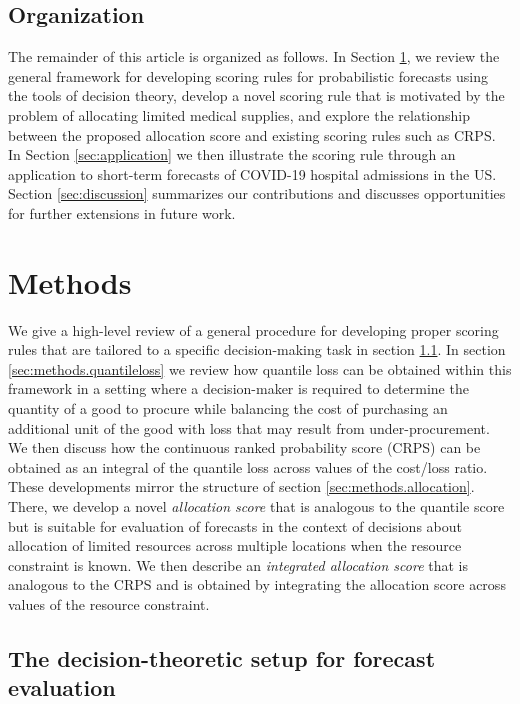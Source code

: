 \documentclass{article}
\begin{document}
\subsection{Organization}

The remainder of this article is organized as follows. 
In Section \ref{sec:methods}, we review the general framework for developing scoring rules for probabilistic forecasts using the tools of decision theory, develop a novel scoring rule that is motivated by the problem of allocating limited medical supplies, and explore the relationship between the proposed allocation score and existing scoring rules such as CRPS. 
In Section \ref{sec:application} we then illustrate the scoring rule through an application to short-term forecasts of COVID-19 hospital admissions in the US. 
Section \ref{sec:discussion} summarizes our contributions and discusses opportunities for further extensions in future work.


\section{Methods}
\label{sec:methods}

We give a high-level review of a general procedure for developing proper scoring rules that are tailored to a specific decision-making task in section \ref{sec:methods.decisiontheory}. In section \ref{sec:methods.quantileloss} we review how quantile loss can be obtained within this framework in a setting where a decision-maker is required to determine the quantity of a good to procure while balancing the cost of purchasing an additional unit of the good with loss that may result from under-procurement. We then discuss how the continuous ranked probability score (CRPS) can be obtained as an integral of the quantile loss across values of the cost/loss ratio. These developments mirror the structure of section \ref{sec:methods.allocation}. There, we develop a novel \emph{allocation score} that is analogous to the quantile score but is suitable for evaluation of forecasts in the context of decisions about allocation of limited resources across multiple locations when the resource constraint is known. We then describe an \emph{integrated allocation score} that is analogous to the CRPS and is obtained by integrating the allocation score across values of the resource constraint.

\subsection{The decision-theoretic setup for forecast evaluation}
\label{sec:methods.decisiontheory}
\end{document}
